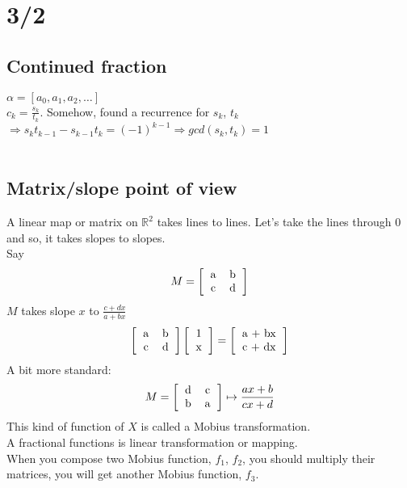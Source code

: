 \section*{3/2}
  \subsection*{Continued fraction}
    $\alpha = [a_0, a_1, a_2, \ldots ]$\\
    $c_k = \frac{s_k}{t_k}$. Somehow, found a recurrence for $s_k$, $t_k$
    $\Rightarrow s_kt_{k-1} - s_{k-1}t_k = (-1)^{k - 1} 
    \Rightarrow gcd(s_k, t_k) = 1$\\\\
  \subsection*{Matrix/slope point of view}
    A linear map or matrix on $\mathbb{R}^2$ takes lines to lines. Let's
    take the lines through 0 and so, it takes slopes to slopes.\\
    Say
    $$
      M = \left[ \begin{tabular}{c c} a & b\\ c&d\end{tabular}\right]
    $$
    $M$ takes slope $x$ to $\frac{c + dx}{a + bx}$\\
    $$
      \left[ \begin{tabular}{c c} a & b \\ c & d \end{tabular} \right]
      \left[ \begin{tabular}{c} 1 \\ x \end{tabular} \right] =
      \left[ \begin{tabular}{c} a + bx \\ c + dx \end{tabular} \right]
    $$
    A bit more standard:\
    $$
      M = \left[ \begin{tabular}{c c} d & c \\ b & a \end{tabular} \right]
        \mapsto \frac{ax + b}{cx + d}
    $$
    This kind of function of $X$ is called a Mobius transformation.\\
    A fractional functions is linear transformation or mapping.\\
    When you compose two Mobius function, $f_1$, $f_2$, you should multiply
    their matrices, you will get another Mobius function, $f_3$.\\
